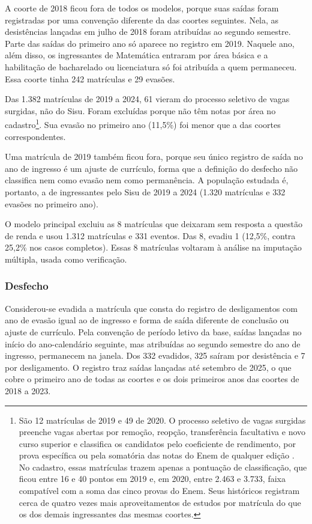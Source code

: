\documentclass[12pt,a4paper]{article}
\begin{document}
A coorte de 2018 ficou fora de todos os modelos, porque suas saídas foram registradas por uma convenção diferente da das coortes seguintes. Nela, as desistências lançadas em julho de 2018 foram atribuídas ao segundo semestre. Parte das saídas do primeiro ano só aparece no registro em 2019. Naquele ano, além disso, os ingressantes de Matemática entraram por área básica e a habilitação de bacharelado ou licenciatura só foi atribuída a quem permaneceu. Essa coorte tinha 242 matrículas e 29 evasões.

Das 1.382 matrículas de 2019 a 2024, 61 vieram do processo seletivo de vagas surgidas, não do Sisu. Foram excluídas porque não têm notas por área no cadastro\footnote{São 12 matrículas de 2019 e 49 de 2020. O processo seletivo de vagas surgidas preenche vagas abertas por remoção, reopção, transferência facultativa e novo curso superior e classifica os candidatos pelo coeficiente de rendimento, por prova específica ou pela somatória das notas do Enem de qualquer edição \citep{ufes2018resolucao8,ufes2020resolucao48}. No cadastro, essas matrículas trazem apenas a pontuação de classificação, que ficou entre 16 e 40 pontos em 2019 e, em 2020, entre 2.463 e 3.733, faixa compatível com a soma das cinco provas do Enem. Seus históricos registram cerca de quatro vezes mais aproveitamentos de estudos por matrícula do que os dos demais ingressantes das mesmas coortes.}. Sua evasão no primeiro ano (11,5\%) foi menor que a das coortes correspondentes.

Uma matrícula de 2019 também ficou fora, porque seu único registro de saída no ano de ingresso é um ajuste de currículo, forma que a definição do desfecho não classifica nem como evasão nem como permanência. A população estudada é, portanto, a de ingressantes pelo Sisu de 2019 a 2024 (1.320 matrículas e 332 evasões no primeiro ano).

O modelo principal excluiu as 8 matrículas que deixaram sem resposta a questão de renda e usou 1.312 matrículas e 331 eventos. Das 8, evadiu 1 (12,5\%, contra 25,2\% nos casos completos). Essas 8 matrículas voltaram à análise na imputação múltipla, usada como verificação.

\subsubsection{Desfecho}
\label{sec:desfecho}

Considerou-se evadida a matrícula que consta do registro de desligamentos com ano de evasão igual ao de ingresso e forma de saída diferente de conclusão ou ajuste de currículo. Pela convenção de período letivo da base, saídas lançadas no início do ano-calendário seguinte, mas atribuídas ao segundo semestre do ano de ingresso, permanecem na janela. Dos 332 evadidos, 325 saíram por desistência e 7 por desligamento. O registro traz saídas lançadas até setembro de 2025, o que cobre o primeiro ano de todas as coortes e os dois primeiros anos das coortes de 2018 a 2023.
\end{document}
